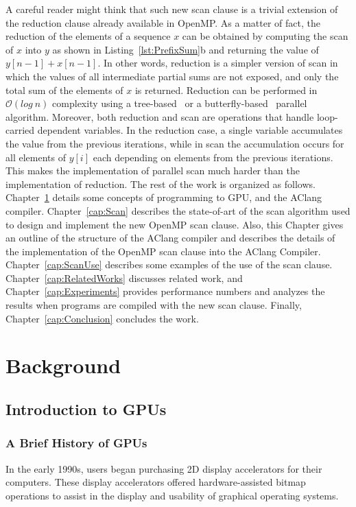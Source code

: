 \documentclass[Ingles]{ic-tese-v1}
\newcommand{\rcap}[1]{Chapter~\ref{cap:#1}}
\newcommand{\rlsts}[2]{Listing~\ref{lst:#1}{#2}}
\begin{document}
A careful  reader might think that  such new scan clause  is a trivial
extension of the  reduction clause already available in  OpenMP.  As a
matter of fact, the reduction of the elements of a sequence $x$ can be
obtained  by  computing  the  scan  of   $x$  into  $y$  as  shown  in
\rlsts{PrefixSum}{b} and returning the value of $y[n-1] + x[n-1]$.  In
other  words, reduction  is a  simpler version  of scan  in which  the
values of all intermediate partial sums  are not exposed, and only the
total  sum of  the  elements of  $x$ is  returned.   Reduction can  be
performed    in    $\mathcal{O}(log\    n)$   complexity    using    a
tree-based~\cite{tree-based}                    or                   a
butterfly-based~\cite{butterfly-based} parallel  algorithm.  Moreover,
both  reduction  and  scan  are operations  that  handle  loop-carried
dependent  variables.   In  the  reduction  case,  a  single  variable
accumulates the value from the  previous iterations, while in scan the
accumulation  occurs for  all  elements of  $y[i]$  each depending  on
elements from the previous  iterations.  This makes the implementation
of parallel scan much harder than the implementation of reduction.
The rest of the work is organized as follows. \rcap{background} details
some concepts of programming to GPU, and the AClang compiler. \rcap{Scan}
describes the state-of-art of the scan algorithm used to design and implement
the new OpenMP scan clause. Also, this Chapter gives an outline of the
structure of the AClang compiler and describes the details of the
implementation of the OpenMP scan clause into the AClang Compiler.
\rcap{ScanUse} describes some examples of the use of the scan clause.
\rcap{RelatedWorks} discusses related work, and \rcap{Experiments} provides
performance numbers and analyzes the results when programs are compiled with
the new scan clause. Finally, \rcap{Conclusion} concludes the work.

\chapter{Background}
\label{cap:background}

\section{Introduction to GPUs}
\subsection{A Brief History of GPUs}
In the early 1990s, users began purchasing
2D display accelerators for their computers. These display accelerators
offered hardware-assisted bitmap operations to assist in the display and usability
of graphical operating systems.
\end{document}
